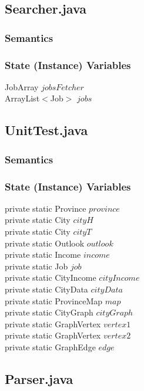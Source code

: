 \documentclass[12pt,fleqn]{article}
\begin{document}
\subsection*{Searcher.java}\label{psearch}

\subsubsection*{Semantics}
\subsubsection*{State (Instance) Variables}
	JobArray $jobsFetcher$\\
	ArrayList$<$Job$>$ $ jobs$

\newpage 
\subsection*{UnitTest.java}\label{utest}

\subsubsection*{Semantics}
\subsubsection*{State (Instance) Variables}
	private static Province $province$ \\
	private static City $cityH$\\
	private static City $cityT$\\
	private static Outlook $outlook$\\
	private static Income $income$\\
	private static Job $job$\\
	private static CityIncome $cityIncome$\\
	private static CityData $cityData$\\
	private static ProvinceMap $map$\\
	private static CityGraph $cityGraph$\\
	private static GraphVertex $vertex1$\\
	private static GraphVertex $vertex2$\\
	private static GraphEdge $edge$\\

\subsection*{Parser.java}\label{pparser}
\end{document}
